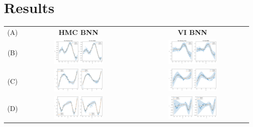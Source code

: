 \documentclass[conference]{IEEEtran}
\begin{document}
\section{Results}
\begin{table}
\centering
\begin{tabular}{ccc}
(A) & \textbf{HMC BNN} & \textbf{VI BNN}\\
(B) & \includegraphics[width=0.45\textwidth]{images/hmc_bnn--problem_A--sb.png} & \includegraphics[width=0.45\textwidth]{images/vi_bnn--problem_A--sb.png}\\
(C) & \includegraphics[width=0.45\textwidth]{images/hmc_bnn--problem_B--sb.png} & \includegraphics[width=0.45\textwidth]{images/vi_bnn--problem_B--sb.png}\\
(D) & \includegraphics[width=0.45\textwidth]{images/hmc_bnn--problem_C--sb.png} & \includegraphics[width=0.45\textwidth]{images/vi_bnn--problem_C--sb.png}\\

\end{tabular}
\end{table}
\end{document}
